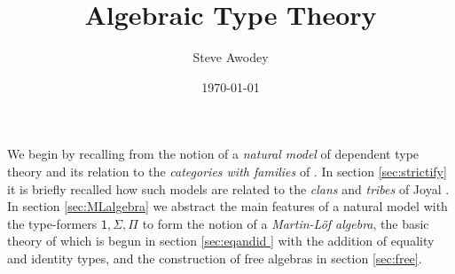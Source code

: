 \documentclass[12pt,reqno]{amsart}
\newcommand{\C}{\ensuremath{\mathbb{C}}}
\newcommand{\op}[1]{\ensuremath{{#1}^{\mathsf{op}}}}
\newcommand{\Set}{\ensuremath{\mathsf{Set}}}
\newcommand{\Cat}{\ensuremath{\mathsf{Cat}}}
\newcommand{\too}{\ensuremath{\longrightarrow}}
\theoremstyle{remark}
\theoremstyle{definition}
\begin{document}


\title{Algebraic Type Theory}
\author{Steve Awodey}
\date{\today}
\maketitle







We begin by recalling from \cite{awodey:NM} the notion of a \emph{natural model} of dependent type theory and its relation to the \emph{categories with families} of \cite{dybjer:CwF}.  In section \ref{sec:strictify} it is briefly recalled how such models are related to the \emph{clans} and \emph{tribes} of Joyal \cite{Joyal:clan}.  In section \ref{sec:MLalgebra} we abstract the main features of a natural model with the type-formers $\mathsf{1}, \Sigma, \Pi$ to form the notion of a \emph{Martin-L\"of algebra}, the basic theory of which is begun in section \ref{sec:eqandid } with the addition of equality and identity types, and the construction of free algebras in section \ref{sec:free}. 
\end{document}
